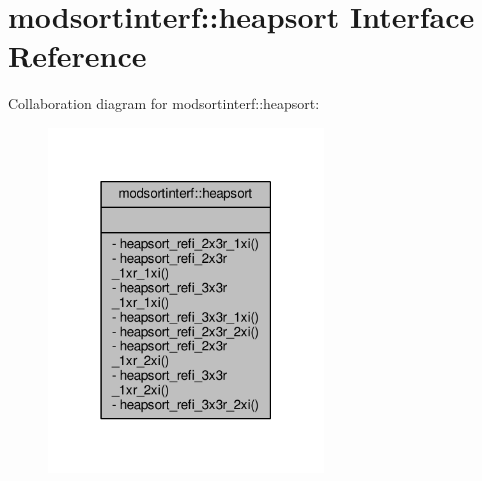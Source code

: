 \hypertarget{interfacemodsortinterf_1_1heapsort}{}\section{modsortinterf\+:\+:heapsort Interface Reference}
\label{interfacemodsortinterf_1_1heapsort}


Collaboration diagram for modsortinterf\+:\+:heapsort\+:\nopagebreak
\begin{figure}[H]
\begin{center}
\leavevmode
\includegraphics[width=207pt]{interfacemodsortinterf_1_1heapsort__coll__graph}
\end{center}
\end{figure}
